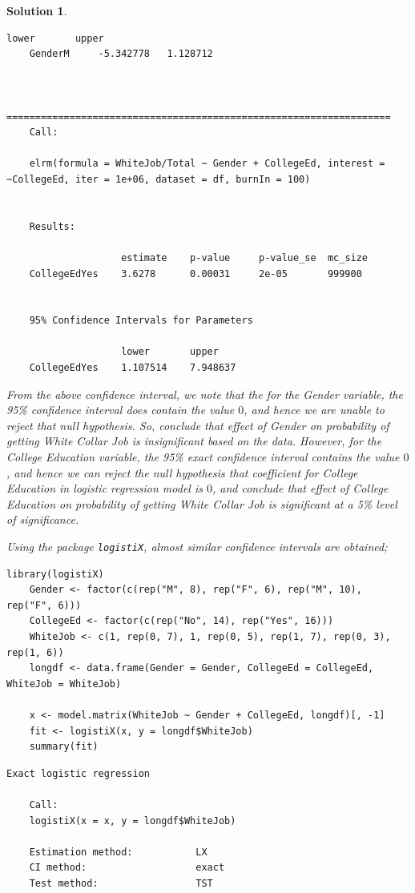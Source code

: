\documentclass[12pt]{article}
\theoremstyle{problemstyle}
\newtheorem*{solution*}{Solution}
\begin{document}
\begin{solution*}
\begin{lstlisting}[style = R-output]
				lower    	upper
	GenderM 	-5.342778 	1.128712
	
	
	===================================================================
	Call:
	
	elrm(formula = WhiteJob/Total ~ Gender + CollegeEd, interest = ~CollegeEd, iter = 1e+06, dataset = df, burnIn = 100)
	
	
	Results:
	
					estimate 	p-value 	p-value_se 	mc_size
	CollegeEdYes   	3.6278 		0.00031     2e-05  		999900
	
	
	95% Confidence Intervals for Parameters
	
					lower    	upper
	CollegeEdYes 	1.107514 	7.948637
\end{lstlisting}

From the above confidence interval, we note that the for the Gender variable, the 95\% confidence interval does contain the value $0$, and hence we are unable to reject that null hypothesis. So, conclude that effect of Gender on probability of getting White Collar Job is insignificant based on the data. However, for the College Education variable, the 95\% exact confidence interval contains the value $0$, and hence we can reject the null hypothesis that coefficient for College Education in logistic regression model is $0$, and conclude that effect of College Education on probability of getting White Collar Job is significant at a 5\% level of significance.

Using the package \texttt{logistiX}, almost similar confidence intervals are obtained;

\begin{lstlisting}[style = R-code]
	library(logistiX)
	Gender <- factor(c(rep("M", 8), rep("F", 6), rep("M", 10), rep("F", 6)))
	CollegeEd <- factor(c(rep("No", 14), rep("Yes", 16)))
	WhiteJob <- c(1, rep(0, 7), 1, rep(0, 5), rep(1, 7), rep(0, 3), rep(1, 6))
	longdf <- data.frame(Gender = Gender, CollegeEd = CollegeEd, WhiteJob = WhiteJob)
	
	x <- model.matrix(WhiteJob ~ Gender + CollegeEd, longdf)[, -1]
	fit <- logistiX(x, y = longdf$WhiteJob)
	summary(fit)
\end{lstlisting}

\begin{lstlisting}[style = R-output]
	Exact logistic regression
	
	Call:
	logistiX(x = x, y = longdf$WhiteJob)
	
	Estimation method:           LX 
	CI method:                   exact  
	Test method:                 TST
	

\end{lstlisting}
\end{solution*}
\end{document}
